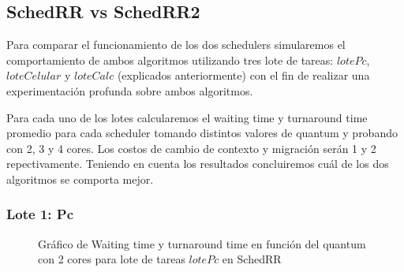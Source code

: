 \subsection{SchedRR vs SchedRR2}

Para comparar el funcionamiento de los dos schedulers simularemos el comportamiento de ambos algoritmos utilizando tres lote de tareas: $lotePc$, $loteCelular$ y $loteCalc$ (explicados anteriormente) con el fin de realizar una experimentación profunda sobre ambos algoritmos.

Para cada uno de los lotes calcularemos el waiting time y turnaround time promedio para cada scheduler tomando distintos valores de quantum y probando con 2, 3 y 4 cores. Los costos de cambio de contexto y migración serán 1 y 2 repectivamente. Teniendo en cuenta los resultados concluiremos cuál de los dos algoritmos se comporta mejor.

\subsubsection{Lote 1: Pc}

\begin{figure}[H]
\hfill
{}
\hfill
{}
\hfill
\caption{Gráfico de Waiting time y turnaround time en función del quantum con 2 cores para lote de tareas $lotePc$ en SchedRR}
\end{figure}

